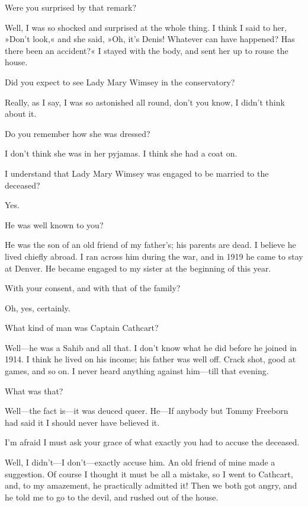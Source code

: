 \begin{dialogue}

 Were you surprised by that remark?

 Well, I was so shocked and surprised at the whole thing.  I think I said to her, »Don't look,« and she said, »Oh, it's Denis!  Whatever can have happened? Has there been an accident?« I stayed with the body, and sent her up to rouse the house.

 Did you expect to see Lady Mary Wimsey in the conservatory?

 Really, as I say, I was so astonished all round, don't you know, I didn't think about it.

 Do you remember how she was dressed?

 I don't think she was in her pyjamas.  I think she had a coat on.

 I understand that Lady Mary Wimsey was engaged to be married to the deceased?

 Yes.

 He was well known to you?

 He was the son of an old friend of my father's; his parents are dead. I believe he lived chiefly abroad. I ran across him during the war, and in 1919 he came to stay at Denver. He became engaged to my sister at the beginning of this year.

 With your consent, and with that of the family?

 Oh, yes, certainly.

 What kind of man was Captain Cathcart?

 Well—he was a Sahib and all that. I don't know what he did before he joined in 1914. I think he lived on his income; his father was well off. Crack shot, good at games, and so on. I never heard anything against him—till that evening.

 What was that?

 Well—the fact is—it was deuced queer. He—If anybody but Tommy Freeborn had said it I should never have believed it. 

 I'm afraid I must ask your grace of what exactly you had to accuse the deceased.

 Well, I didn't—I don't—exactly accuse him. An old friend of mine made a suggestion. Of course I thought it must be all a mistake, so I went to Cathcart, and, to my amazement, he practically admitted it! Then we both got angry, and he told me to go to the devil, and rushed out of the house. 


\end{dialogue}
